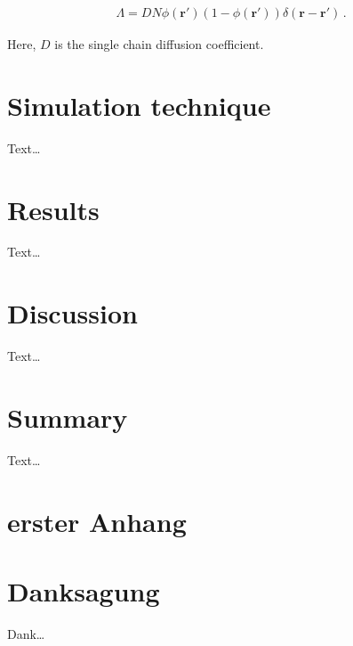 \documentclass[bachelor,       %
               twoside,        %
               BCOR10mm,       %
                ngerman,english  %
               ]{GAUBM}
\begin{document}
\begin{align}
  \Lambda=DN\phi(\mathbf{r'})(1-\phi(\mathbf{r'}))\delta(\mathbf{r}-\mathbf{r'})\,.
\end{align}

Here, $D$ is the single chain diffusion coefficient.

\chapter{Simulation technique}
Text\dots
\chapter{Results}
Text\dots
\chapter{Discussion}
Text\dots
\chapter{Summary}
Text\dots

\appendix
\chapter{erster Anhang}


\cleardoublepage
 

\chapter*{Danksagung}
Dank\dots

\Declaration
\end{document}
